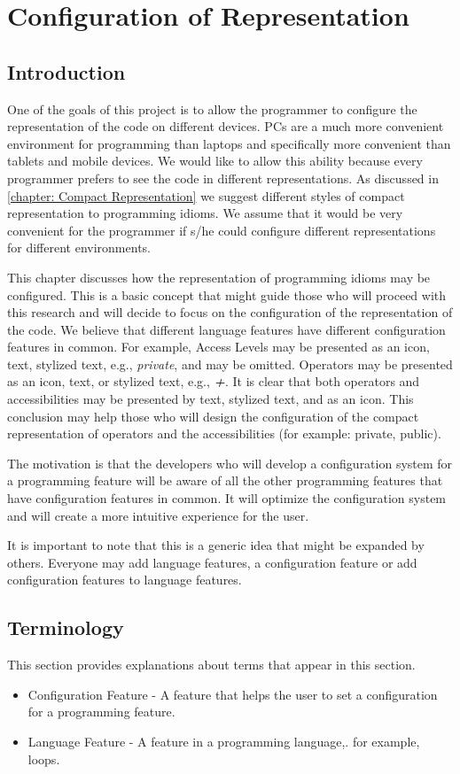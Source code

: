 \chapter{Configuration of Representation} \label{chapter:Configuration of Representation}
\section{Introduction}
One of the goals of this project is to allow the programmer to configure the representation of the code on different devices. PCs are a much more convenient environment for programming than laptops and specifically more convenient than tablets and mobile devices. We would like to allow this ability because every programmer prefers to see the code in different representations. As discussed in \autoref{chapter: Compact Representation} we suggest different styles of compact representation to programming idioms. We assume that it would be very convenient for the programmer if s/he could configure different representations for different environments.

This chapter discusses how the representation of programming idioms may be configured. This is a basic concept that might guide those who will proceed with this research and will decide to focus on the configuration of the representation of the code. We believe that different language features have different configuration features in common. For example, Access Levels may be presented as an icon, text, stylized text, e.g., \textit{private}, and may be omitted. Operators may be presented as an icon, text, or stylized text, e.g., \textbf{\textit{+}}. It is clear that both operators and accessibilities may be presented by text, stylized text, and as an icon. This conclusion may help those who will design the configuration of the compact representation of operators and the accessibilities (for example: private, public).

The motivation is that the developers who will develop a configuration system for a programming feature will be aware of all the other programming features that have configuration features in common. It will optimize the configuration system and will create a more intuitive experience for the user.

It is important to note that this is a generic idea that might be expanded by others. Everyone may add language features, a configuration feature or add configuration features to language features.
\section{Terminology}
This section provides explanations about terms that appear in this section.
\begin{itemize}
	\item Configuration Feature - A feature that helps the user to set a configuration for a programming feature.
	\item Language Feature - A feature in a programming language,. for example, loops.
\end{itemize}

